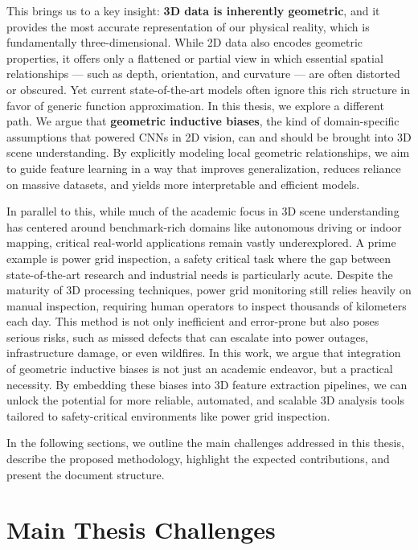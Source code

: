This brings us to a key insight: \textbf{3D data is inherently geometric}, and
it provides the most accurate representation of our physical reality, which is
fundamentally three-dimensional. While 2D data also encodes geometric
properties, it offers only a flattened or partial view in which essential
spatial relationships --- such as depth, orientation, and curvature --- are
often distorted or obscured.
%
Yet current state-of-the-art models often ignore this rich structure in favor
of generic function approximation.
%
In this thesis, we explore a different path. We argue that \textbf{geometric
      inductive biases}, the kind of domain-specific assumptions that powered CNNs in
2D vision, can and should be brought into 3D scene understanding. By explicitly
modeling local geometric relationships, we aim to guide feature learning in a
way that improves generalization, reduces reliance on massive datasets, and
yields more interpretable and efficient models.

In parallel to this, while much of the academic focus in 3D scene understanding
has centered around benchmark-rich domains like autonomous driving or indoor
mapping, critical real-world applications remain vastly underexplored.
%
A prime example is power grid inspection, a safety critical task where the gap
between state-of-the-art research and industrial needs is particularly acute.
%
Despite the maturity of 3D processing techniques, power grid monitoring still
relies heavily on manual inspection, requiring human operators to inspect
thousands of kilometers each day. This method is not only inefficient and
error-prone but also poses serious risks, such as missed defects that can
escalate into power outages, infrastructure damage, or even wildfires.
%
In this work, we argue that integration of geometric inductive biases is not
just an academic endeavor, but a practical necessity. By embedding these biases
into 3D feature extraction pipelines, we can unlock the potential for more
reliable, automated, and scalable 3D analysis tools tailored to safety-critical
environments like power grid inspection.

In the following sections, we outline the main challenges addressed in this
thesis, describe the proposed methodology, highlight the expected
contributions, and present the document structure.

\section{Main Thesis Challenges}

